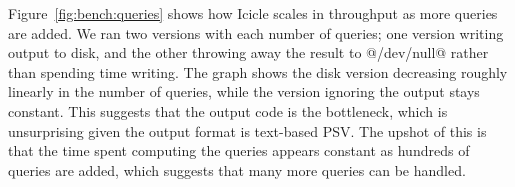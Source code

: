 

Figure~\ref{fig:bench:queries} shows how Icicle scales in throughput as more queries are added.
We ran two versions with each number of queries; one version writing output to disk, and the other throwing away the result to @/dev/null@ rather than spending time writing.
The graph shows the disk version decreasing roughly linearly in the number of queries, while the version ignoring the output stays constant.
This suggests that the output code is the bottleneck, which is unsurprising given the output format is text-based PSV.
The upshot of this is that the time spent computing the queries appears constant as hundreds of queries are added, which suggests that many more queries can be handled.

